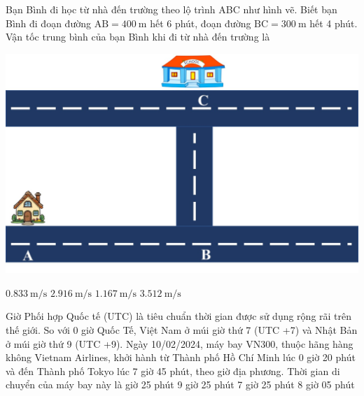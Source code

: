 \begin{ex}
	Bạn Bình đi học từ nhà đến trường theo lộ trình ABC như hình vẽ. Biết bạn Bình đi đoạn đường $\mathrm{AB}=\SI{400}{\meter}$ hết 6 phút, đoạn đường $\mathrm{BC}=\SI{300}{\meter}$ hết 4 phút. Vận tốc trung bình của bạn Bình khi đi từ nhà đến trường là
	\begin{center}
		\includegraphics[width=0.4\linewidth]{../figs/D10-1-3}
	\end{center}
	\choice
	{\True $\SI{0.833}{\meter/\second}$}
	{$\SI{2.916}{\meter/\second}$}
	{$\SI{1.167}{\meter/\second}$}
	{$\SI{3.512}{\meter/\second}$}
\end{ex}
\begin{ex}
	Giờ Phối hợp Quốc tế (UTC) là tiêu chuẩn thời gian được sử dụng rộng rãi trên thế giới. So với 0 giờ Quốc Tế, Việt Nam ở múi giờ thứ 7 (UTC +7) và Nhật Bản ở múi giờ thứ 9 (UTC +9). Ngày 10/02/2024, máy bay VN300, thuộc hãng hàng không Vietnam Airlines, khởi hành từ Thành phố Hồ Chí Minh lúc 0 giờ 20 phút và đến Thành phố Tokyo lúc 7 giờ 45 phút, theo giờ địa phương. Thời gian di chuyển của máy bay này là
	\choice
	{ giờ 25 phút}
	{9 giờ 25 phút}
	{7 giờ 25 phút}
	{8 giờ 05 phút}
	\loigiai{
	}
\end{ex}


